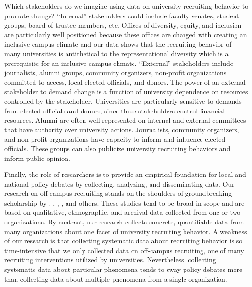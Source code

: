 \documentclass[twoside]{article}
\begin{document}
Which stakeholders do we imagine using data on university recruiting behavior to promote change? ``Internal'' stakeholders could include faculty senates, student groups, board of trustee members, etc. Offices of diversity, equity, and inclusion are particularly well positioned because these offices are charged with creating an inclusive campus climate and our data shows that the recruiting behavior of many universities is antithetical to the representational diversity which is a prerequisite for an inclusive campus climate.  ``External'' stakeholders include journalists, alumni groups, community organizers, non-profit organizations committed to access, local elected officials, and donors.  The power of an external stakeholder to demand change is a function of university dependence on resources controlled by the stakeholder. Universities are particularly sensitive to demands from elected officials and donors, since these stakeholders control financial resources.  Alumni are often well-represented on internal and external committees that have authority over university actions.  Journalists, community organizers, and non-profit organizations have capacity to inform and influence elected officials.  These groups can also publicize university recruiting behaviors and inform public opinion.

Finally, the role of researchers is to provide an empirical foundation for local and national policy debates by collecting, analyzing, and disseminating data.  Our research on off-campus recruiting stands on the shoulders of groundbreaking scholarship by \cite{RN1100}, \cite{RN3519}, \cite{RN4407}, \cite{RN4324}, and others.  These studies tend to be broad in scope and are based on qualitative, ethnographic, and archival data collected from one or two organizations. By contrast, our research collects concrete, quantifiable data from  many organizations about one facet of university recruiting behavior. A weakness of our research is that collecting systematic data about recruiting behavior is so time-intensive that we only collected data on off-campus recruiting, one of many recruiting interventions utilized by universities. Nevertheless, collecting systematic data about particular phenomena tends to sway policy debates more than collecting data about multiple phenomena from a single organization. 
\end{document}
